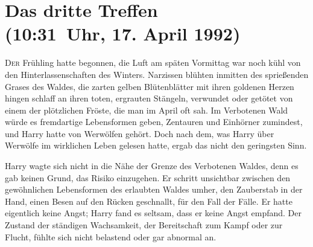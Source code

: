 
\section{Das dritte Treffen\\
(10:31~Uhr, 17. April 1992)}

\lettrine{D}{er} Frühling hatte begonnen, die Luft am späten Vormittag war noch kühl von den Hinterlassenschaften des Winters. Narzissen blühten inmitten des sprießenden Grases des Waldes, die zarten gelben Blütenblätter mit ihren goldenen Herzen hingen schlaff an ihren toten, ergrauten Stängeln, verwundet oder getötet von einem der plötzlichen Fröste, die man im April oft sah. Im Verbotenen Wald würde es fremdartige Lebensformen geben, Zentauren und Einhörner zumindest, und Harry hatte von Werwölfen gehört. Doch nach dem, was Harry über Werwölfe im wirklichen Leben gelesen hatte, ergab das nicht den geringsten Sinn.

Harry wagte sich nicht in die Nähe der Grenze des Verbotenen Waldes, denn es gab keinen Grund, das Risiko einzugehen. Er schritt unsichtbar zwischen den gewöhnlichen Lebensformen des erlaubten Waldes umher, den Zauberstab in der Hand, einen Besen auf den Rücken geschnallt, für den Fall der Fälle. Er hatte eigentlich keine Angst; Harry fand es seltsam, dass er keine Angst empfand. Der Zustand der ständigen Wachsamkeit, der Bereitschaft zum Kampf oder zur Flucht, fühlte sich nicht belastend oder gar abnormal an.


